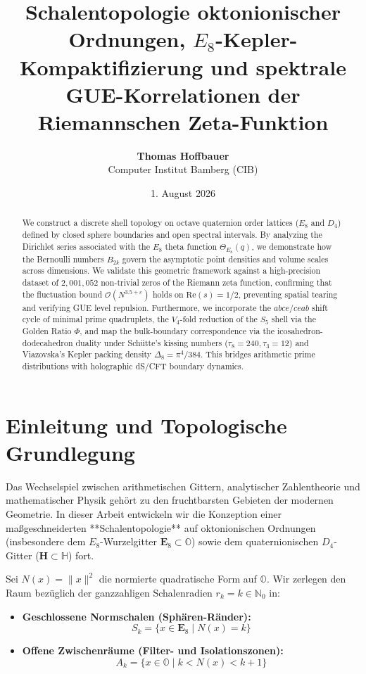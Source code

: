 \documentclass[11pt,a4paper]{article}
\title{\textbf{Schalentopologie oktonionischer Ordnungen, $E_8$-Kepler-Kompaktifizierung und spektrale GUE-Korrelationen der Riemannschen Zeta-Funktion}}
\author{\textbf{Thomas Hoffbauer} \\ \small Computer Institut Bamberg (CIB)}
\date{1. August 2026}
\begin{document}
	
	\maketitle
	
	\begin{abstract}
		We construct a discrete shell topology on octave quaternion order lattices ($E_8$ and $D_4$) defined by closed sphere boundaries and open spectral intervals. By analyzing the Dirichlet series associated with the $E_8$ theta function $\Theta_{E_8}(q)$, we demonstrate how the Bernoulli numbers $B_{2k}$ govern the asymptotic point densities and volume scales across dimensions. We validate this geometric framework against a high-precision dataset of $2{,}001{,}052$ non-trivial zeros of the Riemann zeta function, confirming that the fluctuation bound $\mathcal{O}(N^{3.5+\varepsilon})$ holds on $\text{Re}(s)=1/2$, preventing spatial tearing and verifying GUE level repulsion. Furthermore, we incorporate the $abce/ceab$ shift cycle of minimal prime quadruplets, the $V_4$-fold reduction of the $S_5$ shell via the Golden Ratio $\Phi$, and map the bulk-boundary correspondence via the icosahedron-dodecahedron duality under Schütte's kissing numbers ($\tau_8=240, \tau_3=12$) and Viazovska’s Kepler packing density $\Delta_8 = \pi^4/384$. This bridges arithmetic prime distributions with holographic dS/CFT boundary dynamics.
	\end{abstract}
	
	
	\section{Einleitung und Topologische Grundlegung}
	
	Das Wechselspiel zwischen arithmetischen Gittern, analytischer Zahlentheorie und mathematischer Physik gehört zu den fruchtbarsten Gebieten der modernen Geometrie. In dieser Arbeit entwickeln wir die Konzeption einer maßgeschneiderten **Schalentopologie** auf oktonionischen Ordnungen (insbesondere dem $E_8$-Wurzelgitter $\mathbf{E}_8 \subset \mathbb{O}$) sowie dem quaternionischen $D_4$-Gitter ($\mathbf{H} \subset \mathbb{H}$) fort.
	
	Sei $N(x) = \|x\|^2$ die normierte quadratische Form auf $\mathbb{O}$. Wir zerlegen den Raum bezüglich der ganzzahligen Schalenradien $r_k = k \in \mathbb{N}_0$ in:
	\begin{itemize}
		\item \textbf{Geschlossene Normschalen (Sphären-Ränder):} 
		$$S_k = \{ x \in \mathbf{E}_8 \mid N(x) = k \}$$
		\item \textbf{Offene Zwischenräume (Filter- und Isolationszonen):} 
		$$A_k = \{ x \in \mathbb{O} \mid k < N(x) < k+1 \}$$
	\end{itemize}
	
\end{document}
